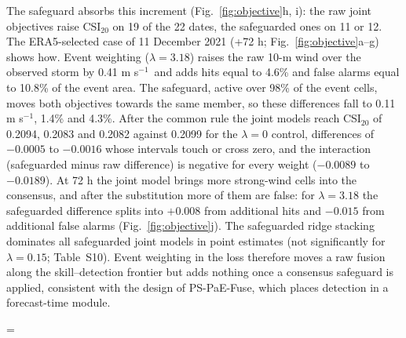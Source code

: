 \documentclass[12pt]{article}
\newcommand{\fitTable}[1]{\begingroup\linespread{1}\selectfont\setbox0=\hbox{#1}\ifdim\wd0>\linewidth\resizebox{\linewidth}{!}{\box0}\else\box0\fi\endgroup}
\newcommand{\mps}{m s$^{-1}$}
\begin{document}
The safeguard absorbs this increment (Fig.~\ref{fig:objective}h, i): the raw joint objectives raise CSI$_{20}$ on 19 of the 22 dates, the safeguarded ones on 11 or 12. The ERA5-selected case of 11 December 2021 (+72 h; Fig.~\ref{fig:objective}a--g) shows how. Event weighting ($\lambda = 3.18$) raises the raw 10-m wind over the observed storm by 0.41 \mps\ and adds hits equal to 4.6\% and false alarms equal to 10.8\% of the event area. The safeguard, active over 98\% of the event cells, moves both objectives towards the same member, so these differences fall to 0.11 \mps, 1.4\% and 4.3\%. After the common rule the joint models reach CSI$_{20}$ of 0.2094, 0.2083 and 0.2082 against 0.2099 for the $\lambda=0$ control, differences of $-0.0005$ to $-0.0016$ whose intervals touch or cross zero, and the interaction (safeguarded minus raw difference) is negative for every weight ($-0.0089$ to $-0.0189$). At 72 h the joint model brings more strong-wind cells into the consensus, and after the substitution more of them are false: for $\lambda = 3.18$ the safeguarded difference splits into $+0.008$ from additional hits and $-0.015$ from additional false alarms (Fig.~\ref{fig:objective}j). The safeguarded ridge stacking dominates all safeguarded joint models in point estimates (not significantly for $\lambda = 0.15$; Table~S10). Event weighting in the loss therefore moves a raw fusion along the skill--detection frontier but adds nothing once a consensus safeguard is applied, consistent with the design of PS-PaE-Fuse, which places detection in a forecast-time module.

\begin{table}[t]
\caption{Frozen 2021 cross-year scores of the objective experiment (22 initialization dates, 72/120/168 h, six variables): the four training objectives of the linear stacking on raw and safeguarded output, three-seed means with the sample standard deviation over seeds in parentheses, together with the matched controls and the four members. nMSE is the training-scale normalized mean-square error, CSI$_{20}$ the equal-lead CSI for 20 \mps\ wind and $Q = \mathrm{nMSE} + 0.15\,(1-\mathrm{CSI}_{20})$ the common selection functional.}
\label{tab:joint}
\vspace*{2mm}
\centering
\small
\fitTable{}
\end{table}
\end{document}
